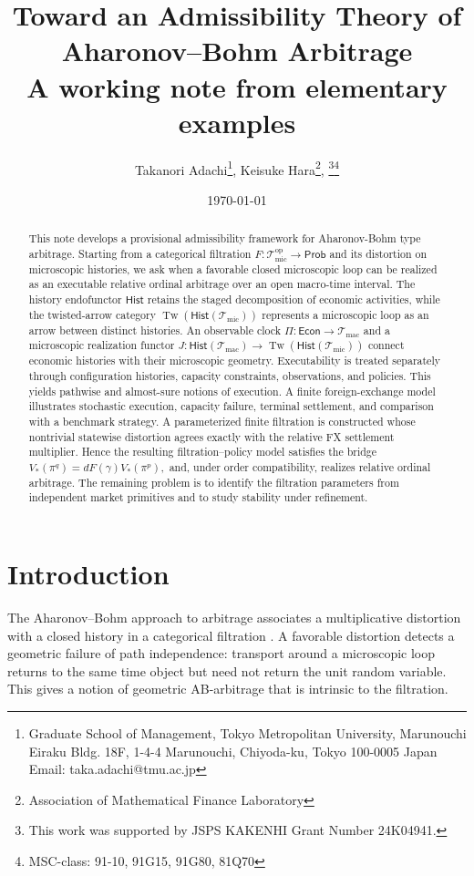 \documentclass[11pt,a4paper]{article}
\title{Toward an Admissibility Theory of Aharonov--Bohm Arbitrage\\
\large A working note from elementary examples}
\author{Takanori Adachi\footnote{Graduate School of Management, Tokyo Metropolitan University, Marunouchi Eiraku Bldg. 18F, 1-4-4 Marunouchi, Chiyoda-ku, Tokyo 100-0005 Japan\\Email: taka.adachi@tmu.ac.jp},
Keisuke Hara\footnote{Association of Mathematical Finance Laboratory},
\footnote{This work was supported by JSPS KAKENHI Grant Number 24K04941.}\footnote{
MSC-class:
    91-10, %
    91G15, %
    91G80, %
    81Q70 %
}
}
\date{\today}
\begin{document}
\maketitle

\begin{abstract}
\noindent
This note develops a provisional admissibility framework for
Aharonov-Bohm type arbitrage. Starting from a categorical filtration
$
  F:\mathcal T_{\mathrm{mic}}^{\mathrm{op}}\to \mathsf{Prob}
$
and its distortion on microscopic histories, we ask when a favorable
closed microscopic loop can be realized as an executable relative
ordinal arbitrage over an open macro-time interval. The history
endofunctor \(\mathsf{Hist}\) retains the staged decomposition of economic
activities, while the twisted-arrow category
\(\operatorname{Tw}(\mathsf{Hist}(\mathcal T_{\mathrm{mic}}))\) represents a microscopic loop as an arrow between
distinct histories. An observable clock
\(\Pi: \mathsf{Econ} \to \mathcal T_{\mathrm{mac}} \) and a microscopic realization functor
$
  J: \mathsf{Hist}(\mathcal T_{\mathrm{mac}}) \to \operatorname{Tw}(\mathsf{Hist}(\mathcal T_{\mathrm{mic}}))
$
connect economic histories with their microscopic geometry.
Executability is treated separately through configuration histories,
capacity constraints, observations, and policies. This yields pathwise
and almost-sure notions of execution.
A finite foreign-exchange model illustrates stochastic execution, capacity failure, terminal settlement,
and comparison with a benchmark strategy. 
A parameterized finite filtration is constructed whose nontrivial
statewise distortion agrees exactly with the relative FX settlement
multiplier. Hence the resulting filtration--policy model satisfies the bridge
$V_*(\pi^q)=dF(\gamma)V_*(\pi^p),$
and, under order compatibility, realizes relative ordinal arbitrage.
The remaining problem is to identify the filtration parameters from
independent market primitives and to study stability under refinement.
\end{abstract}


\section{Introduction}
\label{sec:introduction}

The Aharonov--Bohm approach to arbitrage associates a multiplicative
distortion with a closed history in a categorical filtration
\cite{AdachiHaraAB}.  A favorable distortion detects a geometric failure of
path independence: transport around a microscopic loop returns to the same
time object but need not return the unit random variable.  This gives a
notion of geometric AB-arbitrage that is intrinsic to the filtration.
\end{document}
